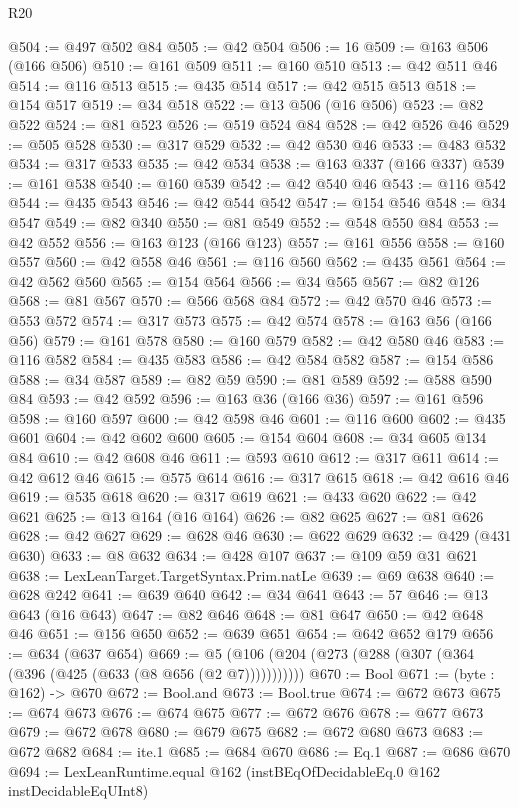 \begin{lexlean}{R20}
\begin{coremodule}
{{{{{{{{{{{{{{{{{{{@504 := @497 @502 @84
@505 := @42 @504
@506 := 16
@509 := @163 @506 (@166 @506)
@510 := @161 @509
@511 := @160 @510
@513 := @42 @511 @46
@514 := @116 @513
@515 := @435 @514
@517 := @42 @515 @513
@518 := @154 @517
@519 := @34 @518
@522 := @13 @506 (@16 @506)
@523 := @82 @522
@524 := @81 @523
@526 := @519 @524 @84
@528 := @42 @526 @46
@529 := @505 @528
@530 := @317 @529
@532 := @42 @530 @46
@533 := @483 @532
@534 := @317 @533
@535 := @42 @534
@538 := @163 @337 (@166 @337)
@539 := @161 @538
@540 := @160 @539
@542 := @42 @540 @46
@543 := @116 @542
@544 := @435 @543
@546 := @42 @544 @542
@547 := @154 @546
@548 := @34 @547
@549 := @82 @340
@550 := @81 @549
@552 := @548 @550 @84
@553 := @42 @552
@556 := @163 @123 (@166 @123)
@557 := @161 @556
@558 := @160 @557
@560 := @42 @558 @46
@561 := @116 @560
@562 := @435 @561
@564 := @42 @562 @560
@565 := @154 @564
@566 := @34 @565
@567 := @82 @126
@568 := @81 @567
@570 := @566 @568 @84
@572 := @42 @570 @46
@573 := @553 @572
@574 := @317 @573
@575 := @42 @574
@578 := @163 @56 (@166 @56)
@579 := @161 @578
@580 := @160 @579
@582 := @42 @580 @46
@583 := @116 @582
@584 := @435 @583
@586 := @42 @584 @582
@587 := @154 @586
@588 := @34 @587
@589 := @82 @59
@590 := @81 @589
@592 := @588 @590 @84
@593 := @42 @592
@596 := @163 @36 (@166 @36)
@597 := @161 @596
@598 := @160 @597
@600 := @42 @598 @46
@601 := @116 @600
@602 := @435 @601
@604 := @42 @602 @600
@605 := @154 @604
@608 := @34 @605 @134 @84
@610 := @42 @608 @46
@611 := @593 @610
@612 := @317 @611
@614 := @42 @612 @46
@615 := @575 @614
@616 := @317 @615
@618 := @42 @616 @46
@619 := @535 @618
@620 := @317 @619
@621 := @433 @620
@622 := @42 @621
@625 := @13 @164 (@16 @164)
@626 := @82 @625
@627 := @81 @626
@628 := @42 @627
@629 := @628 @46
@630 := @622 @629
@632 := @429 (@431 @630)
@633 := @8 @632
@634 := @428 @107
@637 := @109 @59 @31 @621
@638 := LexLeanTarget.TargetSyntax.Prim.natLe
@639 := @69 @638
@640 := @628 @242
@641 := @639 @640
@642 := @34 @641
@643 := 57
@646 := @13 @643 (@16 @643)
@647 := @82 @646
@648 := @81 @647
@650 := @42 @648 @46
@651 := @156 @650
@652 := @639 @651
@654 := @642 @652 @179
@656 := @634 (@637 @654)
@669 := @5 (@106 (@204 (@273 (@288 (@307 (@364 (@396 (@425 (@633 (@8 @656 (@2 @7)))))))))))
@670 := Bool
@671 := (byte : @162) -> @670
@672 := Bool.and
@673 := Bool.true
@674 := @672 @673
@675 := @674 @673
@676 := @674 @675
@677 := @672 @676
@678 := @677 @673
@679 := @672 @678
@680 := @679 @675
@682 := @672 @680 @673
@683 := @672 @682
@684 := ite.{1}
@685 := @684 @670
@686 := Eq.{1}
@687 := @686 @670
@694 := LexLeanRuntime.equal @162 (instBEqOfDecidableEq.{0} @162 instDecidableEqUInt8)
}}}}}}}}}}}}}}}}}}}
\end{coremodule}
\end{lexlean}

